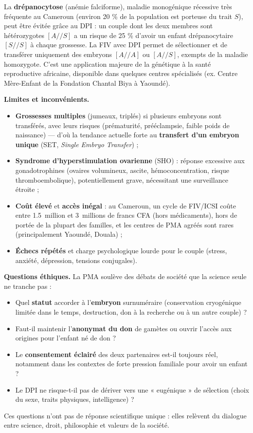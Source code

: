 \documentclass[11pt]{article}
\begin{document}
\begin{savaistu}
La \textbf{drépanocytose} (anémie falciforme), maladie monogénique récessive très fréquente au Cameroun (environ 20 \% de la population est porteuse du trait $S$), peut être évitée grâce au DPI : un couple dont les deux membres sont hétérozygotes $[A//S]$ a un risque de 25 \% d'avoir un enfant drépanocytaire $[S//S]$ à chaque grossesse. La FIV avec DPI permet de sélectionner et de transférer uniquement des embryons $[A//A]$ ou $[A//S]$, exempts de la maladie homozygote. C'est une application majeure de la génétique à la santé reproductive africaine, disponible dans quelques centres spécialisés (ex. Centre Mère-Enfant de la Fondation Chantal Biya à Yaoundé).
\end{savaistu}

\textbf{Limites et inconvénients.}
\begin{itemize}
\item \textbf{Grossesses multiples} (jumeaux, triplés) si plusieurs embryons sont transférés, avec leurs risques (prématurité, prééclampsie, faible poids de naissance) — d'où la tendance actuelle forte au \textbf{transfert d'un embryon unique} (SET, \emph{Single Embryo Transfer}) ;
\item \textbf{Syndrome d'hyperstimulation ovarienne} (SHO) : réponse excessive aux gonadotrophines (ovaires volumineux, ascite, hémoconcentration, risque thromboembolique), potentiellement grave, nécessitant une surveillance étroite ;
\item \textbf{Coût élevé} et \textbf{accès inégal} : au Cameroun, un cycle de FIV/ICSI coûte entre \SI{1,5}{million} et \SI{3}{millions} de francs CFA (hors médicaments), hors de portée de la plupart des familles, et les centres de PMA agréés sont rares (principalement Yaoundé, Douala) ;
\item \textbf{Échecs répétés} et charge psychologique lourde pour le couple (stress, anxiété, dépression, tensions conjugales).
\end{itemize}

\textbf{Questions éthiques.} La PMA soulève des débats de société que la science seule ne tranche pas :
\begin{itemize}
\item Quel \textbf{statut} accorder à l'\textbf{embryon} surnuméraire (conservation cryogénique limitée dans le temps, destruction, don à la recherche ou à un autre couple) ?
\item Faut-il maintenir l'\textbf{anonymat du don} de gamètes ou ouvrir l'accès aux origines pour l'enfant né de don ?
\item Le \textbf{consentement éclairé} des deux partenaires est-il toujours réel, notamment dans les contextes de forte pression familiale pour avoir un enfant ?
\item Le DPI ne risque-t-il pas de dériver vers une « eugénique » de sélection (choix du sexe, traits physiques, intelligence) ?
\end{itemize}
Ces questions n'ont pas de réponse scientifique unique : elles relèvent du dialogue entre science, droit, philosophie et valeurs de la société.
\end{document}
